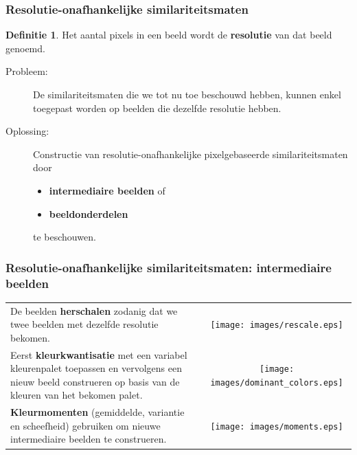 \documentclass[dutch]{beamer}
\theoremstyle{definition}
\newtheorem{definitie}[theorem]{Definitie}
\theoremstyle{remark}
\theoremstyle{example}
\begin{document}
\frame
{
  \frametitle{Resolutie-onafhankelijke similariteitsmaten}
  
  \begin{definitie}
  Het aantal pixels in een beeld wordt de \textbf{resolutie} van dat beeld genoemd.
  \end{definitie}
  \begin{description}
	\item[Probleem:] De similariteitsmaten die we tot nu toe beschouwd hebben, kunnen
	enkel toegepast worden op beelden die dezelfde resolutie hebben.
	\item[Oplossing:] Constructie van resolutie-onafhankelijke 
	pixelgebaseerde similariteitsmaten door
	\begin{itemize}
      \item \textbf{intermediaire beelden} of 
      \item \textbf{beeldonderdelen} 
    \end{itemize}
    te beschouwen.
  \end{description}
}
\frame
{
  \frametitle{Resolutie-onafhankelijke similariteitsmaten: intermediaire beelden}

  \begin{center}
  \begin{tabular}{@{}lc@{}}
  \begin{minipage}{0.6\textwidth}
  De beelden \textbf{herschalen} zodanig dat we twee beelden met dezelfde resolutie bekomen. 
  \end{minipage} & 
  \begin{minipage}{0.4\textwidth}
  \texttt{[image: images/rescale.eps]}
  \end{minipage}\vspace{5pt}\\
  \begin{minipage}{0.6\textwidth}
  Eerst \textbf{kleurkwantisatie} met een variabel kleurenpalet toepassen en vervolgens een
  nieuw beeld construeren op basis van de kleuren van het bekomen palet.
  \end{minipage} &
  \begin{minipage}{0.4\textwidth}
  \texttt{[image: images/dominant\_colors.eps]}
  \end{minipage}\vspace{5pt}\\
  \begin{minipage}{0.6\textwidth}
  \textbf{Kleurmomenten} (gemiddelde, variantie en scheefheid) gebruiken om nieuwe 
  intermediaire beelden te construeren.
  \end{minipage} &
  \begin{minipage}{0.4\textwidth}
  \texttt{[image: images/moments.eps]}
  \end{minipage}
  \end{tabular}
  \end{center}
}
\end{document}
